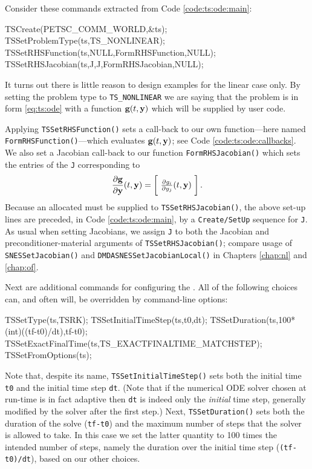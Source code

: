 Consider these commands extracted from Code \ref{code:ts:ode:main}:
\begin{code}
  TSCreate(PETSC_COMM_WORLD,&ts);
  TSSetProblemType(ts,TS_NONLINEAR);
  TSSetRHSFunction(ts,NULL,FormRHSFunction,NULL);
  TSSetRHSJacobian(ts,J,J,FormRHSJacobian,NULL);
\end{code}
It turns out there is little reason to design \PETSc examples for the linear case only.  By setting the problem type to \texttt{TS\_NONLINEAR} we are saying that the problem is in form \eqref{eq:ts:ode} with a function $\mathbf{g}(t,\mathbf{y})$ which will be supplied by user code.

Applying \texttt{TSSetRHSFunction()} sets a call-back to our own function---here named \texttt{FormRHSFunction()}---which evaluates $\mathbf{g}(t,\mathbf{y})$; see Code \ref{code:ts:ode:callbacks}.  We also set a Jacobian call-back to our function \texttt{FormRHSJacobian()} which sets the entries of the \pMat \texttt{J} corresponding to
    $$\frac{\partial \mathbf{g}}{\partial \mathbf{y}}(t,\mathbf{y}) = \begin{bmatrix}\phantom{\bigg|} \frac{\partial g_i}{\partial y_j}(t,\mathbf{y}) \phantom{\bigg|}\end{bmatrix}.$$
Because an allocated \pMat must be supplied to \texttt{TSSetRHSJacobian()}, the above \pTS set-up lines are preceded, in Code \ref{code:ts:ode:main}, by a \texttt{Create/SetUp} sequence for \pMat \texttt{J}.  As usual when setting Jacobians, we assign \texttt{J} to both the Jacobian and preconditioner-material arguments of \texttt{TSSetRHSJacobian()}; compare usage of \texttt{SNESSetJacobian()} and \texttt{DMDASNESSetJacobianLocal()} in Chapters \ref{chap:nl} and \ref{chap:of}.

Next are additional commands for configuring the \pTS.  All of the following choices can, and often will, be overridden by command-line options:
\begin{code}
  TSSetType(ts,TSRK);
  TSSetInitialTimeStep(ts,t0,dt);
  TSSetDuration(ts,100*(int)((tf-t0)/dt),tf-t0);
  TSSetExactFinalTime(ts,TS_EXACTFINALTIME_MATCHSTEP);
  TSSetFromOptions(ts);
\end{code}
Note that, despite its name, \texttt{TSSetInitialTimeStep()} sets both the initial time \texttt{t0} and the initial time step \texttt{dt}.  (Note that if the numerical ODE solver chosen at run-time is in fact adaptive then \texttt{dt} is indeed only the \emph{initial} time step, generally modified by the solver after the first step.)  Next, \texttt{TSSetDuration()} sets both the duration of the solve (\texttt{tf-t0}) and the maximum number of steps that the solver is allowed to take.  In this case we set the latter quantity to 100 times the intended number of steps, namely the duration over the initial time step (\texttt{(tf-t0)/dt}), based on our other choices.


